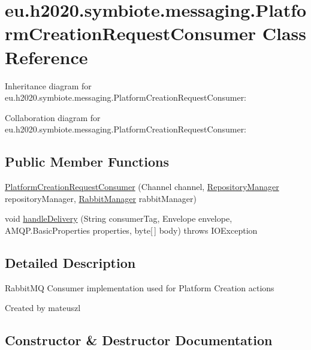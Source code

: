 \hypertarget{classeu_1_1h2020_1_1symbiote_1_1messaging_1_1PlatformCreationRequestConsumer}{}\section{eu.\+h2020.\+symbiote.\+messaging.\+Platform\+Creation\+Request\+Consumer Class Reference}
\label{classeu_1_1h2020_1_1symbiote_1_1messaging_1_1PlatformCreationRequestConsumer}


Inheritance diagram for eu.\+h2020.\+symbiote.\+messaging.\+Platform\+Creation\+Request\+Consumer\+:


Collaboration diagram for eu.\+h2020.\+symbiote.\+messaging.\+Platform\+Creation\+Request\+Consumer\+:
\subsection*{Public Member Functions}
\begin{DoxyCompactItemize}
\item 
\hyperlink{classeu_1_1h2020_1_1symbiote_1_1messaging_1_1PlatformCreationRequestConsumer_ac7f4497c390c067a2e42196b0e050bf9}{Platform\+Creation\+Request\+Consumer} (Channel channel, \hyperlink{classeu_1_1h2020_1_1symbiote_1_1repository_1_1RepositoryManager}{Repository\+Manager} repository\+Manager, \hyperlink{classeu_1_1h2020_1_1symbiote_1_1messaging_1_1RabbitManager}{Rabbit\+Manager} rabbit\+Manager)
\item 
void \hyperlink{classeu_1_1h2020_1_1symbiote_1_1messaging_1_1PlatformCreationRequestConsumer_a5effadb30758abb5f438be74a6c7f054}{handle\+Delivery} (String consumer\+Tag, Envelope envelope, A\+M\+Q\+P.\+Basic\+Properties properties, byte\mbox{[}$\,$\mbox{]} body)  throws I\+O\+Exception 
\end{DoxyCompactItemize}


\subsection{Detailed Description}
Rabbit\+MQ Consumer implementation used for Platform Creation actions

Created by mateuszl 

\subsection{Constructor \& Destructor Documentation}
